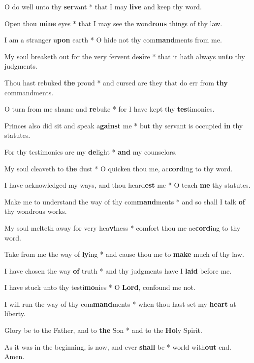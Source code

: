 \begin{multicols}{2}
	O do well unto thy \textbf{ser}vant * that I may \textbf{live} and keep thy word.
	
	Open thou \textbf{mine} eyes * that I may see the wond\textbf{rous} things of thy law.
	
	I am a stranger u\textbf{pon} earth * O hide not thy com\textbf{mand}ments from me.
	
	My soul breaketh out for the very fervent de\textbf{si}re * that it hath always un\textbf{to} thy judgments.
	
	Thou hast rebuked \textbf{the} proud * and cursed are they that do err from \textbf{thy} commandments.
	
	O turn from me shame and \textbf{re}buke * for I have kept thy \textbf{tes}timonies.
	
	Princes also did sit and speak a\textbf{gainst} me * but thy servant is occupied \textbf{in} thy statutes.
	
	For thy testimonies are my \textbf{de}light * \textbf{and} my counselors.
	
	My soul cleaveth to \textbf{the} dust * O quicken thou me, ac\textbf{cord}ing to thy word.
	
	I have acknowledged my ways, and thou heard\textbf{est} me * O teach \textbf{me} thy statutes.
	
	Make me to understand the way of thy com\textbf{mand}ments * and so shall I talk \textbf{of} thy wondrous works.
	
	My soul melteth away for very hea\textbf{vi}ness * comfort thou me ac\textbf{cord}ing to thy word.
	
	Take from me the way of \textbf{ly}ing * and cause thou me to \textbf{make} much of thy law.
	
	I have chosen the way \textbf{of} truth * and thy judgments have I \textbf{laid} before me.
	
	I have stuck unto thy testi\textbf{mo}nies * O \textbf{Lord}, confound me not.
	
	I will run the way of thy com\textbf{mand}ments * when thou hast set my \textbf{heart} at liberty.
	
	Glory be to the Father, and to \textbf{the} Son * and to the \textbf{Ho}ly Spirit.
	
	As it was in the beginning, is now, and ever \textbf{shall} be * world with\textbf{out} end. Amen.
\end{multicols}